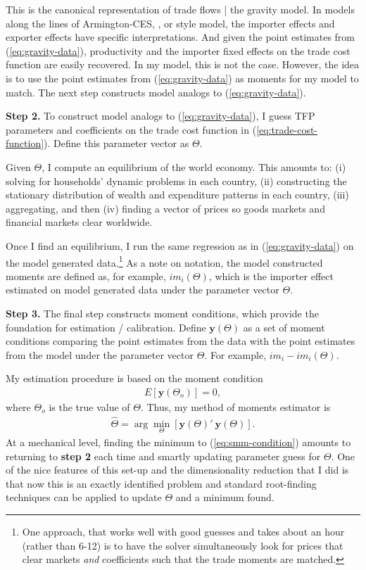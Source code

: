 \documentclass[12pt,pdftex]{article}
\begin{document}
\begin{onehalfspacing}
This is the canonical representation of trade flows | the gravity model. In models along the lines of Armington-CES, \citet{eaton2002technology}, or \citet{melitz2003impact} style model, the importer effects and exporter effects have specific interpretations. And given the point estimates from (\ref{eq:gravity-data}), productivity and the importer fixed effects on the trade cost function are easily recovered. In my model, this is not the case. However, the idea is to use the point estimates from (\ref{eq:gravity-data}) as moments for my model to match. The next step constructs model analogs to (\ref{eq:gravity-data}).

\textbf{Step 2.} To construct model analogs to (\ref{eq:gravity-data}), I guess TFP parameters and coefficients on the trade cost function in (\ref{eq:trade-cost-function}). Define this parameter vector as $\Theta$.

Given $\Theta$, I compute an equilibrium of the world economy. This amounts to: (i) solving for households' dynamic problems in each country, (ii) constructing the stationary distribution of wealth and expenditure patterns in each country, (iii) aggregating, and then (iv) finding a vector of prices so goods markets and financial markets clear worldwide.

Once I find an equilibrium, I run the same regression as in (\ref{eq:gravity-data}) on the model generated data.\footnote{One approach, that works well with good guesses and takes about an hour (rather than 6-12) is to have the solver simultaneously look for prices that clear markets \emph{and} coefficients such that the trade moments are matched.} As a note on notation, the model constructed moments are defined as, for example, $im_{i}(\Theta)$, which is the importer effect estimated on model generated data under the parameter vector $\Theta$.

\textbf{Step 3.} The final step constructs moment conditions, which provide the foundation for estimation / calibration. Define $\mathbf{y}(\Theta)$ as a set of moment conditions comparing the point estimates from the data with the point estimates from the model under the parameter vector $\Theta$. For example, ${im_{i}} - im_{i}(\Theta)$.

My estimation procedure is based on the moment condition
\begin{align}
E\left[\mathbf{y}(\Theta_o)\right] = 0,
\end{align}
where $\Theta_o$ is the true value of $\Theta$. Thus, my method of moments estimator is
\begin{align}
\hat{\Theta} = \arg\min_{\Theta} \left[\mathbf{y}(\Theta)'\ \mathbf{y}(\Theta)\right]. \label{eq:smm-condition}
\end{align}
At a mechanical level, finding the minimum to (\ref{eq:smm-condition}) amounts to returning to \textbf{step 2} each time and smartly updating parameter guess for $\Theta$. One of the nice features of this set-up and the dimensionality reduction that I did is that now this is an exactly identified problem and standard root-finding techniques can be applied to update $\Theta$ and a minimum found.


\end{onehalfspacing}
\end{document}
